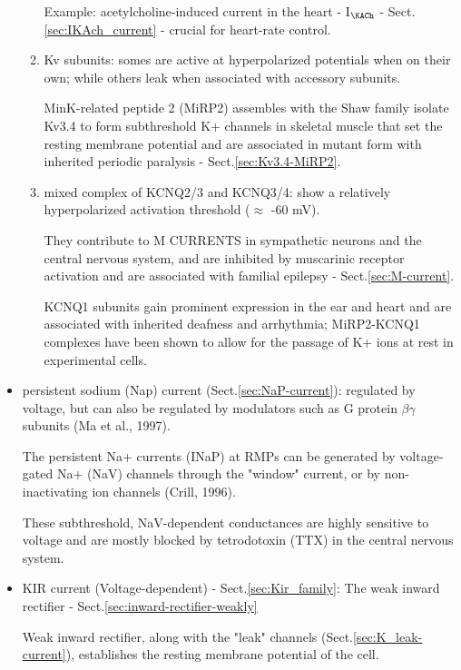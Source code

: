 \begin{itemize}
\begin{enumerate}
  
Example: acetylcholine-induced current in the heart - I$_\KACh$ -
Sect.\ref{sec:IKAch_current} - crucial for heart-rate control.

  \item Kv subunits: somes are active at hyperpolarized potentials
when on their own; while others leak when associated with
accessory subunits.

MinK-related peptide 2 (MiRP2) assembles with the Shaw family isolate Kv3.4 to
form subthreshold K+ channels in skeletal muscle that set the resting membrane
potential and are associated in mutant form with inherited periodic paralysis -
Sect.\ref{sec:Kv3.4-MiRP2}.

  \item mixed complex of KCNQ2/3 and KCNQ3/4: show a relatively hyperpolarized
  activation threshold ($\approx$ -60 mV).

They contribute to M CURRENTS in sympathetic neurons and the central nervous
system, and are inhibited by muscarinic receptor activation and are associated
with familial epilepsy - Sect.\ref{sec:M-current}.
 
KCNQ1 subunits gain prominent expression in the ear and heart and are associated
with inherited deafness and arrhythmia; MiRP2-KCNQ1 complexes have been shown to
allow for the passage of K+ ions at rest in experimental cells.
 
\end{enumerate}
  
  \item persistent sodium (Nap) current (Sect.\ref{sec:NaP-current}): regulated
  by voltage, but can also be regulated by modulators such as G protein
  $\beta\gamma$ subunits (Ma et al., 1997).
  
  The persistent Na+ currents (INaP) at RMPs can be generated by voltage-gated
  Na+ (NaV) channels through the "window" current, or by non-inactivating ion
  channels (Crill, 1996).
  
  These subthreshold, NaV-dependent conductances are highly sensitive to voltage
  and are mostly blocked by tetrodotoxin (TTX) in the central nervous system. 
  
  \item KIR current (Voltage-dependent) - Sect.\ref{sec:Kir_family}: The weak
  inward rectifier - Sect.\ref{sec:inward-rectifier-weakly}

    Weak inward rectifier, along with the "leak" channels
    (Sect.\ref{sec:K_leak-current}), establishes the resting membrane potential
    of the cell.   
  

\end{itemize}

